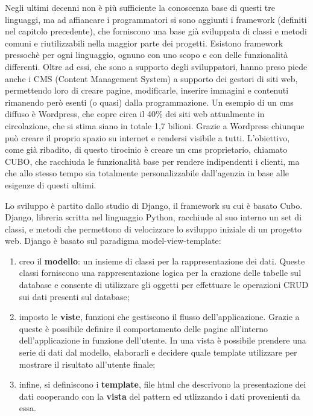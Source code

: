 \documentclass[12pt,a4paper]{article}
\begin{document}
Negli ultimi decenni non è più sufficiente la conoscenza base di questi tre linguaggi, ma ad affiancare i programmatori si sono aggiunti i framework (definiti nel capitolo precedente), che forniscono una base già sviluppata di classi e metodi comuni e riutilizzabili nella maggior parte dei progetti. Esistono framework pressochè per ogni linguaggio, ognuno con uno scopo e con delle funzionalità differenti.
Oltre ad essi, che sono a supporto degli sviluppatori, hanno preso piede anche i CMS (Content Management System) a supporto dei	gestori di siti web, permettendo loro di creare pagine, modificarle, inserire immagini e contenuti rimanendo però esenti (o quasi) dalla programmazione.
Un esempio di un cms diffuso è Wordpress, che copre circa il 40\% dei siti web attualmente in circolazione, che si stima siano in totale 1,7 bilioni.
Grazie a Wordpress chiunque può creare il proprio spazio su internet e rendersi visibile a tutti.
L’obiettivo, come già ribadito, di questo tirocinio è creare un cms proprietario, chiamato CUBO, che racchiuda le funzionalità base per rendere indipendenti i clienti, ma che allo stesso tempo sia totalmente personalizzabile dall’agenzia in base alle esigenze di questi ultimi.

Lo sviluppo è partito dallo studio di Django, il framework su cui è basato Cubo.
Django, libreria scritta nel linguaggio Python, racchiude al suo interno un set di classi, e metodi che permettono di velocizzare lo sviluppo iniziale di un progetto web. Django è basato sul paradigma model-view-template:
\begin{enumerate}
    \item creo il \textbf{modello}: un insieme di classi per la rappresentazione dei dati. Queste classi forniscono una rappresentazione logica per la crazione delle tabelle sul database e consente di utilizzare gli oggetti per effettuare le operazioni CRUD sui dati presenti sul database;
    \item imposto le \textbf{viste}, funzioni che gestiscono il flusso dell’applicazione. Grazie a queste è possibile definire il comportamento delle pagine all’interno dell’applicazione in funzione dell'utente. In una vista è possibile prendere una serie di dati dal modello, elaborarli e decidere quale template utilizzare per mostrare il risultato all’utente finale;
    \item infine, si definiscono i \textbf{template}, file html che descrivono la presentazione dei dati cooperando con la \textbf{vista} del pattern ed utlizzando i dati provenienti da essa.
\end{enumerate}
\end{document}
